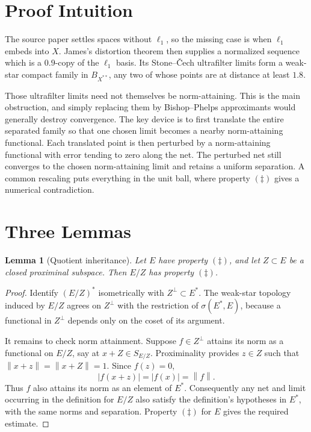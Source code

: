 \documentclass[11pt]{article}
\newtheorem{lemma}{Lemma}
\newcommand{\norm}[1]{\left\lVert #1\right\rVert}
\begin{document}
\section*{Proof Intuition}

The source paper settles spaces without \(\ell_1\), so the missing case is
when \(\ell_1\) embeds into \(X\).  James's distortion theorem then supplies a
normalized sequence which is a \(0.9\)-copy of the \(\ell_1\) basis.  Its
Stone--\v Cech ultrafilter limits form a weak-star compact family in
\(B_{X^{**}}\), any two of whose points are at distance at least \(1.8\).

Those ultrafilter limits need not themselves be norm-attaining.  This is the
main obstruction, and simply replacing them by Bishop--Phelps approximants
would generally destroy convergence.  The key device is to first translate
the entire separated family so that one chosen limit becomes a nearby
norm-attaining functional.  Each translated point is then perturbed by a
norm-attaining functional with error tending to zero along the net.  The
perturbed net still converges to the chosen norm-attaining limit and retains a
uniform separation.  A common rescaling puts everything in the unit ball,
where property \((\ddagger)\) gives a numerical contradiction.

\section*{Three Lemmas}

\begin{lemma}[Quotient inheritance]\label{lem:quotient}
Let \(E\) have property \((\ddagger)\), and let \(Z\subset E\) be a closed
proximinal subspace.  Then \(E/Z\) has property \((\ddagger)\).
\end{lemma}

\begin{proof}
Identify \((E/Z)^*\) isometrically with \(Z^\perp\subset E^*\).  The weak-star
topology induced by \(E/Z\) agrees on \(Z^\perp\) with the restriction of
\(\sigma(E^*,E)\), because a functional in \(Z^\perp\) depends only on the
coset of its argument.

It remains to check norm attainment.  Suppose \(f\in Z^\perp\) attains its
norm as a functional on \(E/Z\), say at \(x+Z\in S_{E/Z}\).  Proximinality
provides \(z\in Z\) such that
\(\norm{x+z}=\norm{x+Z}=1\).  Since \(f(z)=0\),
\[
  |f(x+z)|=|f(x)|=\norm f.
\]
Thus \(f\) also attains its norm as an element of \(E^*\).  Consequently any
net and limit occurring in the definition for \(E/Z\) also satisfy the
definition's hypotheses in \(E^*\), with the same norms and separation.
Property \((\ddagger)\) for \(E\) gives the required estimate.
\end{proof}
\end{document}

